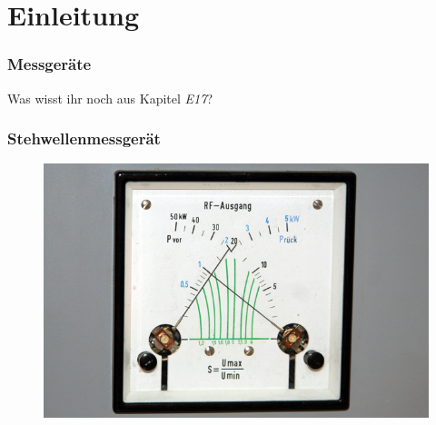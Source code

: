 

\subtitle{Technik A 16: \\
Messtechnik \\[2em]}
\date{Stand 20.03.2017}



\section*{Einleitung}

\begin{frame}
  \frametitle{Messgeräte}
  {\Large Was wisst ihr noch aus Kapitel \emph{E17}?}
\end{frame}

\begin{frame}
  \frametitle{Stehwellenmessgerät}
  \begin{center}
    \begin{figure}
      \includegraphics[width=1\textwidth,height=.7\textheight,keepaspectratio]{a16/RS_SWR.jpg}
    \end{figure}
  \end{center}
\end{frame}

